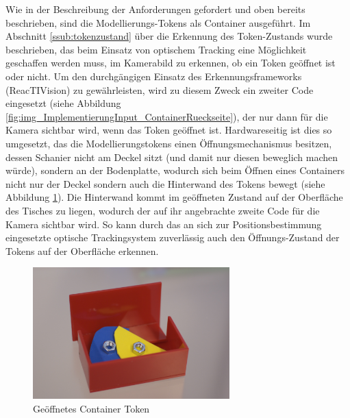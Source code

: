 Wie in der Beschreibung der Anforderungen gefordert und oben bereits beschrieben, sind die Modellierungs-Tokens als Container ausgeführt. Im Abschnitt \ref{ssub:tokenzustand} über die Erkennung des Token-Zustands wurde beschrieben, das beim Einsatz von optischem Tracking eine Möglichkeit geschaffen werden muss, im Kamerabild zu erkennen, ob ein Token geöffnet ist oder nicht. Um den durchgängigen Einsatz des Erkennungsframeworks (ReacTIVision) zu gewährleisten, wird zu diesem Zweck ein zweiter Code eingesetzt (siehe Abbildung \ref{fig:img_ImplementierungInput_ContainerRueckseite}), der nur dann für die Kamera sichtbar wird, wenn das Token geöffnet ist. Hardwareseitig ist dies so umgesetzt, das die Modellierungstokens einen Öffnungsmechanismus besitzen, dessen Schanier nicht am Deckel sitzt (und damit nur diesen beweglich machen würde), sondern an der Bodenplatte, wodurch sich beim Öffnen eines Containers nicht nur der Deckel sondern auch die Hinterwand des Tokens bewegt (siehe Abbildung \ref{fig:img_ImplementierungInput_ContainerToken}). Die Hinterwand kommt im geöffneten Zustand auf der Oberfläche des Tisches zu liegen, wodurch der auf ihr angebrachte zweite Code für die Kamera sichtbar wird. So kann durch das an sich zur Positionsbestimmung eingesetzte optische Trackingsystem zuverlässig auch den Öffnungs-Zustand der Tokens auf der Oberfläche erkennen.

\begin{figure}[htbp]
	\centering
		\includegraphics[height=2in]{img/ImplementierungInput/ContainerToken.jpg}
	\caption{Geöffnetes Container Token}
	\label{fig:img_ImplementierungInput_ContainerToken}
\end{figure}

